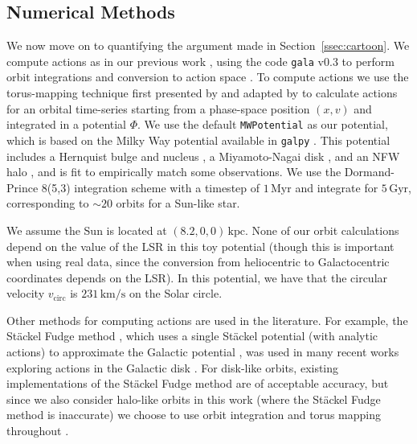 \documentclass[twocolumn]{aastex62}
\newcommand{\kpc}{\text{kpc}}
\newcommand{\Myr}{\text{Myr}}
\newcommand{\Gyr}{\text{Gyr}}
\newcommand{\kms}{\text{km}/\text{s}}
\begin{document}
\subsection{Numerical Methods} \label{ssec:action_comp}
We now move on to quantifying the argument made in Section~\ref{ssec:cartoon}.
We compute actions as in our previous work \citep{2018ApJ...867...31B}, using
the code \texttt{gala} v0.3 to perform orbit integrations and conversion to
action space \citep{2017JOSS....2..388P,Price-Whelan:2018}. To compute actions
we use the torus-mapping technique first presented by
\citet{1990MNRAS.244..634M} and adapted by \citet{2014MNRAS.441.3284S} to
calculate actions for an orbital time-series starting from a phase-space
position $(x, v)$ and integrated in a potential $\Phi$. We use the default
\texttt{MWPotential} as our potential, which is based on the Milky Way
potential available in \texttt{galpy} \citep{2015ApJS..216...29B}. This
potential includes a Hernquist bulge and nucleus \citep{1990ApJ...356..359H},
a Miyamoto-Nagai disk \citep{1975PASJ...27..533M}, and an NFW halo
\citep{1997ApJ...490..493N}, and is fit to empirically match some
observations. We use the Dormand-Prince 8(5,3) integration scheme
\citep{Dormand80:integrator} with a timestep of $1\,\Myr$ and integrate for
$5\,\Gyr$, corresponding to $\sim 20$ orbits for a Sun-like star.

We assume the Sun is located at $(8.2, 0, 0)\,\kpc$. None of our orbit
calculations depend on the value of the LSR in this toy potential (though this
is important when using real data, since the conversion from heliocentric to
Galactocentric coordinates depends on the LSR). In this potential, we have
that the circular velocity $v_{\text{circ}}$ is $231\,\kms$ on the Solar
circle.

Other methods for computing actions are used in the literature. For example,
the St\"ackel Fudge method \citep{2016MNRAS.457.2107S}, which uses a single
St\"ackel potential (with analytic actions) to approximate the Galactic
potential \citep{1985MNRAS.216..273D,2012MNRAS.426.1324B}, was used in many
recent works exploring actions in the Galactic disk
\citep[e.g.][]{2019MNRAS.484.3291T,2018MNRAS.481.4093S,2018arXiv180803278T}.
For disk-like orbits, existing implementations of the St\"ackel Fudge method
are of acceptable accuracy, but since we also consider halo-like orbits in
this work (where the St\"ackel Fudge method is inaccurate) we choose to use
orbit integration and torus mapping throughout \citep{2016MNRAS.457.2107S}.
\end{document}
